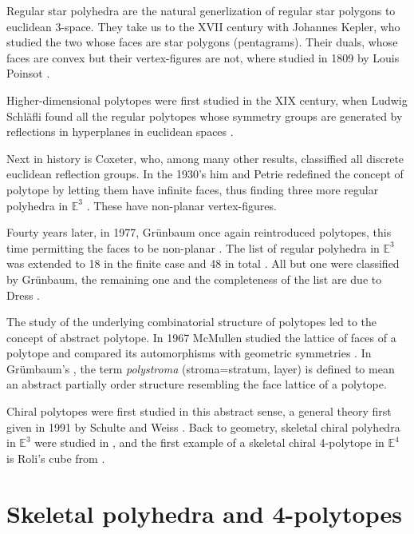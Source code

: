 Regular star polyhedra are the natural
generlization of regular star polygons to
euclidean 3-space. They take us to the XVII
century with Johannes Kepler, who studied the
two whose faces are star polygons
(pentagrams). Their duals, whose faces are
convex but their vertex-figures are not,
where studied in 1809 by Louis Poinsot
\cite{abstract-polytopes}.

Higher-dimensional polytopes were first
studied in the XIX century, when Ludwig
Schläfli found all the regular polytopes
whose symmetry groups are generated by
reflections in hyperplanes in euclidean
spaces \cite{abstract-polytopes}.

Next in history is Coxeter, who, among many
other results, classiffied all discrete
euclidean reflection groups. In the 1930's
him and Petrie redefined the concept of
polytope by letting them have infinite faces,
thus finding three more regular polyhedra in
$\mathbb{E}^3$ \cite{regular-skew}. These
have non-planar vertex-figures.

Fourty years later, in 1977, Grünbaum once
again reintroduced polytopes, this time
permitting the faces to be non-planar
\cite{grunbaum-old-and-new}. The list of
regular polyhedra in $\mathbb{E}^3$ was
extended to 18 in the finite case and 48 in
total \cite{regular-ordinary}. All but one
were classified by Grünbaum, the remaining
one and the completeness of the list are due
to Dress \cite{Dress1981,Dress1985}.

The study of the underlying combinatorial
structure of polytopes led to the concept of
abstract polytope. In 1967 McMullen studied
the lattice of faces of a polytope and
compared its automorphisms with geometric
symmetries \cite{mcmullen-combinatorially}.
In Grümbaum's \cite{grunbaum-regularity}, the
term \textit{polystroma} (stroma=stratum,
layer) is defined to mean an abstract
partially order structure resembling the face
lattice of a polytope.

Chiral polytopes were first studied in this
abstract sense, a general theory first given
in 1991 by Schulte and Weiss
\cite{schulte-chiral}. Back to geometry,
skeletal chiral polyhedra in $\mathbb{E}^3$
were studied in
\cite{chiral-polyhedra-i,chiral-polyhedra-ii},
and the first example of a skeletal chiral
4-polytope in $\mathbb{E}^4$ is Roli's cube
from \cite{rolis-cube}.

\section{Skeletal polyhedra and 4-polytopes}
\label{section-skeletal}

